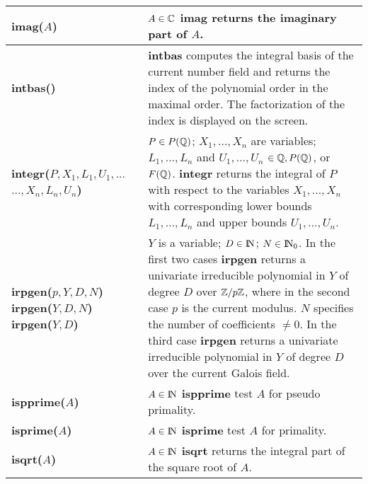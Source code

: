 {\begin{tabular}{|p{1.95in}|p{3.83in}|}
{\bf imag($A$)} &
$A \in \mbox{$\mathbb C$}$\newline
{\bf imag} returns the imaginary part of $A$.\\ \hline

{\bf intbas()} &
{\bf intbas} computes the integral basis of the current number field
and returns the index of the polynomial order in the maximal order.
The factorization of the index is displayed on the screen.\\ \hline

{\bf integr($ P,X_1,L_1,U_1, ...$}\newline
\hspace*{0.6cm} {\bf $...,X_n,L_n,U_n$)} &
$P \in P(\mbox{$\mathbb Q$})$; $X_1,...,X_n$ are variables; \newline
$L_1,...,L_n$ and $U_1,...,U_n$ $\in \mbox{$\mathbb Q$}, P(\mbox{$\mathbb Q$})$, or $F(\mbox{$\mathbb Q$})$.\newline
{\bf integr} returns the integral of $P$ with respect to the variables $X_1,...,X_n$
with corresponding lower bounds\newline
$L_1, ..., L_n$ and upper bounds $U_1, ..., U_n$.\\ \hline

{\bf irpgen($p,Y,D,N$)} \newline
{\bf irpgen($Y,D,N$)} \newline
{\bf irpgen($Y,D$)} &
$Y$ is a variable; $D\in {\rm{I\!N}}$; $N\in {\rm{I\!N}}_0$.\newline
In the first two cases {\bf irpgen} returns a univariate ir\-re\-du\-ci\-ble 
polynomial in $Y$ of degree $D$ over $\mbox{$\mathbb Z$}/p\mbox{$\mathbb Z$}$, where in the second case $p$ is 
the current modulus. $N$ specifies the number of coefficients $\not= 0$.\newline
In the third case {\bf irpgen} returns a univariate irreducible polynomial in
$Y$ of degree $D$ over the current Galois field. \\ \hline

{\bf ispprime($A$)} &
$A \in {\rm{I\!N}}$\newline
{\bf ispprime} test $A$ for pseudo primality.\\ \hline

{\bf isprime($A$)} &
$A \in {\rm{I\!N}}$\newline
{\bf isprime} test $A$ for primality.\\ \hline

{\bf isqrt($A$)} &
$A \in {\rm{I\!N}}$\newline
{\bf isqrt} returns the integral part of the square root of $A$.\\ \hline


\end{tabular}}
